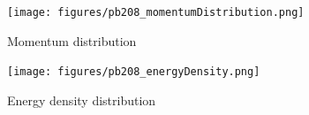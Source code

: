 \begin{figure}[H]
    \centering
    \texttt{[image: figures/pb208\_momentumDistribution.png]}
    \caption{Momentum distribution}
    \label{DOMFitData_pb208_momentumDistribution}
\end{figure}

\begin{figure}[H]
    \centering
    \texttt{[image: figures/pb208\_energyDensity.png]}
    \caption{Energy density distribution}
    \label{DOMFitData_pb208_energyDensity}
\end{figure}
